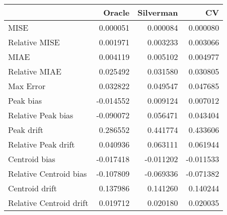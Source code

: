 \begin{tabular}{lrrr}
  \hline
 & Oracle & Silverman & CV \\ 
  \hline
MISE & 0.000051 & 0.000084 & 0.000080 \\ 
  Relative MISE & 0.001971 & 0.003233 & 0.003066 \\ 
  MIAE & 0.004119 & 0.005102 & 0.004977 \\ 
  Relative MIAE & 0.025492 & 0.031580 & 0.030805 \\ 
  Max Error & 0.032822 & 0.049547 & 0.047685 \\ 
  Peak bias & -0.014552 & 0.009124 & 0.007012 \\ 
  Relative Peak bias & -0.090072 & 0.056471 & 0.043404 \\ 
  Peak drift & 0.286552 & 0.441774 & 0.433606 \\ 
  Relative Peak drift & 0.040936 & 0.063111 & 0.061944 \\ 
  Centroid bias & -0.017418 & -0.011202 & -0.011533 \\ 
  Relative Centroid bias & -0.107809 & -0.069336 & -0.071382 \\ 
  Centroid drift & 0.137986 & 0.141260 & 0.140244 \\ 
  Relative Centroid drift & 0.019712 & 0.020180 & 0.020035 \\ 
   \hline
\end{tabular}
